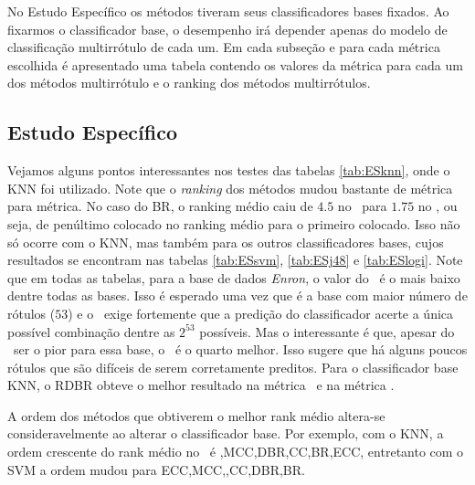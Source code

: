 No Estudo Específico os métodos tiveram seus classificadores bases fixados.
Ao fixarmos o classificador base, 
o desempenho irá depender apenas do modelo de classificação multirrótulo
de cada um.
Em cada subseção e para cada métrica escolhida é apresentado uma tabela
contendo os valores da métrica para cada um dos métodos multirrótulo e
o ranking dos métodos multirrótulos.



\subsection{Estudo Específico}







Vejamos alguns pontos interessantes nos testes das tabelas
\ref{tab:ESknn}, onde o KNN foi utilizado.
Note que o \textit{ranking} dos métodos mudou bastante de métrica para métrica.
No caso do BR, o ranking médio caiu de $4.5$ no \SA~para $1.75$ no \HL, ou seja,
de penúltimo colocado no ranking médio para o primeiro colocado. 
Isso não só ocorre com o KNN, mas também para os outros classificadores bases, cujos resultados
se encontram nas tabelas
\ref{tab:ESsvm}, \ref{tab:ESj48} e \ref{tab:ESlogi}.
Note que em todas as tabelas, para a base de dados \textit{Enron},
o valor do \SA~é o mais baixo dentre todas as bases.
Isso é esperado uma vez que é a base com maior número de rótulos ($53$) e o
\SA~exige fortemente que a predição do classificador acerte a única possível combinação dentre as $2^{53}$ possíveis.
Mas o interessante é que, apesar do \SA~ser o pior para essa base, o \HL~é o quarto melhor.
Isso sugere que há alguns poucos rótulos que são difíceis de serem corretamente preditos.
Para o classificador base KNN, o RDBR obteve o melhor resultado na métrica \SA~e na métrica \EBA.

A ordem dos métodos que obtiverem o melhor rank médio altera-se consideravelmente
ao alterar o classificador base.
Por exemplo, com o KNN, a ordem crescente do rank médio no \SA~é \MRLMa,MCC,DBR,CC,BR,ECC,
entretanto com o SVM a ordem mudou para ECC,MCC,\MRLMa,CC,DBR,BR.

